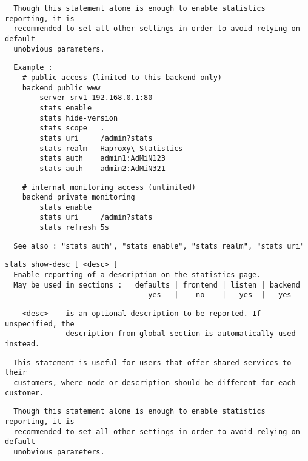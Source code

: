 \begin{verbatim}
  Though this statement alone is enough to enable statistics reporting, it is
  recommended to set all other settings in order to avoid relying on default
  unobvious parameters.
\end{verbatim}

\begin{verbatim}
  Example :
    # public access (limited to this backend only)
    backend public_www
        server srv1 192.168.0.1:80
        stats enable
        stats hide-version
        stats scope   .
        stats uri     /admin?stats
        stats realm   Haproxy\ Statistics
        stats auth    admin1:AdMiN123
        stats auth    admin2:AdMiN321
\end{verbatim}

\begin{verbatim}
    # internal monitoring access (unlimited)
    backend private_monitoring
        stats enable
        stats uri     /admin?stats
        stats refresh 5s
\end{verbatim}

\begin{verbatim}
  See also : "stats auth", "stats enable", "stats realm", "stats uri"
\end{verbatim}

\begin{verbatim}
stats show-desc [ <desc> ]
  Enable reporting of a description on the statistics page.
  May be used in sections :   defaults | frontend | listen | backend
                                 yes   |    no    |   yes  |   yes
\end{verbatim}

\begin{verbatim}
    <desc>    is an optional description to be reported. If unspecified, the
              description from global section is automatically used instead.
\end{verbatim}

\begin{verbatim}
  This statement is useful for users that offer shared services to their
  customers, where node or description should be different for each customer.
\end{verbatim}

\begin{verbatim}
  Though this statement alone is enough to enable statistics reporting, it is
  recommended to set all other settings in order to avoid relying on default
  unobvious parameters.
\end{verbatim}

